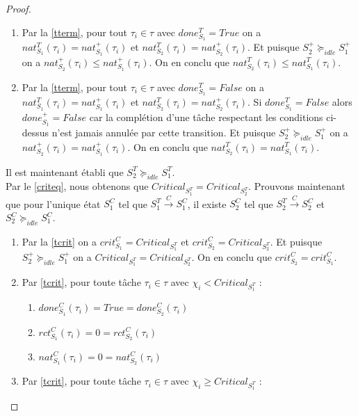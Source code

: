 \documentclass[a4paper]{report}
\theoremstyle{break}
\theoremstyle{breakplain}
\begin{document}
\begin{proof}
\begin{enumerate}
\item Par la \autoref{tterm}, pour tout $\tau_i \in \tau$ avec $done_{S_1}^T = True$ on a $nat_{S_1}^T(\tau_i) = nat_{S_1}^+(\tau_i)$ et $nat_{S_2}^T(\tau_i) = nat_{S_2}^+(\tau_i)$. Et puisque $S^+_2 \succeq_{idle} S^+_1$ on a $nat_{S_2}^+(\tau_i)\leq nat_{S_1}^+(\tau_i)$. On en conclu que $nat_{S_2}^T(\tau_i) \leq nat_{S_1}^T(\tau_i)$.
\item Par la \autoref{tterm}, pour tout $\tau_i \in \tau$ avec $done_{S_1}^T = False$ on a $nat_{S_1}^T(\tau_i) = nat_{S_1}^+(\tau_i)$ et $nat_{S_2}^T(\tau_i) = nat_{S_2}^+(\tau_i)$. Si $done^T_{S_1} = False$ alors $done^+_{S_1} = False$ car la complétion d'une tâche respectant les conditions ci-dessus n'est jamais annulée par cette transition. Et puisque $S^+_2 \succeq_{idle} S^+_1$ on a $nat_{S_2}^+(\tau_i)= nat_{S_1}^+(\tau_i)$. On en conclu que $nat_{S_2}^T(\tau_i) = nat_{S_1}^T(\tau_i)$.
\end{enumerate}
Il est maintenant établi que $S^T_2 \succeq_{idle} S^T_1$.\\

Par le \autoref{criteq}, nous obtenons que $Critical_{S_1^T} = Critical_{S_2^T}$. Prouvons maintenant que pour l'unique état $S_1^C$ tel que $S^{T}_1\xrightarrow{C}S^{C}_1$, il existe $S_2^C$ tel que $S^{T}_2\xrightarrow{C}S^{C}_2$ et $S^C_2 \succeq_{idle} S^C_1$.

\begin{enumerate}

\item Par la \autoref{tcrit} on a $crit_{S_1}^C = Critical_{S_1^T}$ et $crit_{S_2}^C = Critical_{S_2^T}$. Et puisque $S^+_2 \succeq_{idle} S^+_1$ on a $Critical_{S_1^T} = Critical_{S_2^T}$. On en conclu que $crit_{S_2}^C= crit_{S_1}^C$.


\item Par \autoref{tcrit}, pour toute tâche $\tau_i \in \tau$ avec $\chi_i < Critical_{S_1^T}$ :
\begin{enumerate}[label=(\alph*)]
\item $done_{S_1}^C(\tau_i) = True = done_{S_2}^C(\tau_i)$
\item $rct_{S_1}^C(\tau_i) = 0 = rct_{S_2}^C(\tau_i)$
\item $nat_{S_1}^C(\tau_i) = 0 = nat_{S_2}^C(\tau_i)$
\end{enumerate}

\item Par \autoref{tcrit}, pour toute tâche $\tau_i \in \tau$ avec $\chi_i \geq Critical_{S_1^T}$ :
\begin{enumerate}[label=(\alph*)]


\end{enumerate}
\end{enumerate}
\end{proof}
\end{document}
